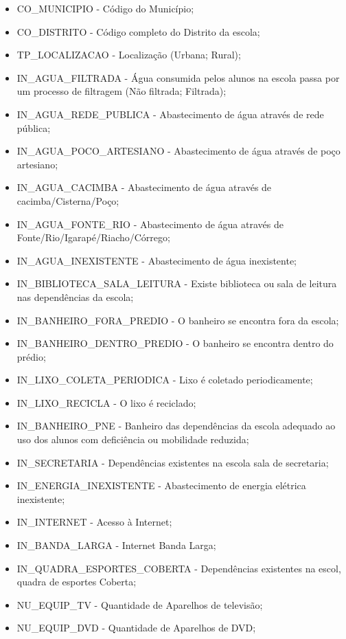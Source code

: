 \begin{itemize}
	\item CO\_MUNICIPIO - Código do Município;
	\item CO\_DISTRITO - Código completo do Distrito da escola;
	\item TP\_LOCALIZACAO - Localização (Urbana; Rural);
	\item IN\_AGUA\_FILTRADA - Água consumida pelos alunos na escola passa por um processo de filtragem (Não filtrada; Filtrada);
	\item IN\_AGUA\_REDE\_PUBLICA - Abastecimento de água através de rede pública;
	\item IN\_AGUA\_POCO\_ARTESIANO - Abastecimento de água através de poço artesiano;
	\item IN\_AGUA\_CACIMBA - Abastecimento de água através de cacimba/Cisterna/Poço;
	\item IN\_AGUA\_FONTE\_RIO - Abastecimento de água através de Fonte/Rio/Igarapé/Riacho/Córrego;
	\item IN\_AGUA\_INEXISTENTE - Abastecimento de água inexistente;
	\item IN\_BIBLIOTECA\_SALA\_LEITURA - Existe biblioteca ou sala de leitura nas dependências da escola;
	\item IN\_BANHEIRO\_FORA\_PREDIO - O banheiro se encontra fora da escola;
	\item IN\_BANHEIRO\_DENTRO\_PREDIO - O banheiro se encontra dentro do prédio;
	\item IN\_LIXO\_COLETA\_PERIODICA - Lixo é coletado periodicamente;
	\item IN\_LIXO\_RECICLA - O lixo é reciclado;
	\item IN\_BANHEIRO\_PNE - Banheiro das dependências da escola adequado ao uso dos alunos com deficiência ou mobilidade reduzida;
	\item IN\_SECRETARIA - Dependências existentes na escola sala de secretaria;
	\item IN\_ENERGIA\_INEXISTENTE - Abastecimento de energia elétrica inexistente;
	\item IN\_INTERNET - Acesso à Internet;
	\item IN\_BANDA\_LARGA - Internet Banda Larga;
	\item IN\_QUADRA\_ESPORTES\_COBERTA - Dependências existentes na escol, quadra de esportes Coberta;
	\item NU\_EQUIP\_TV - Quantidade de Aparelhos de televisão;
	\item NU\_EQUIP\_DVD - Quantidade de Aparelhos de DVD;

\end{itemize}
